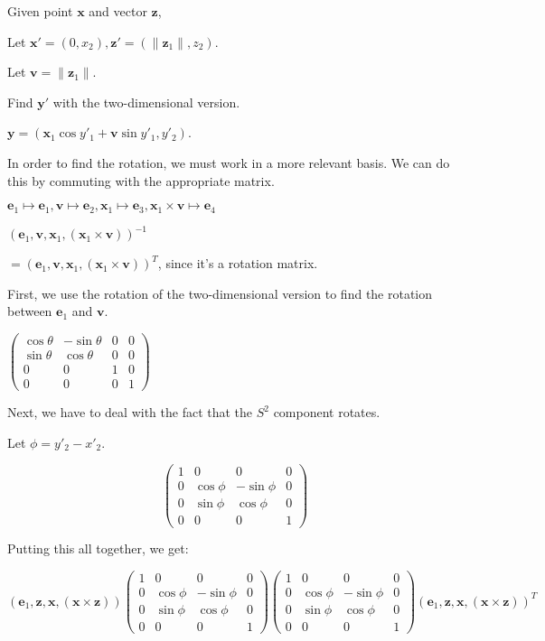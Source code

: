 \bigskip

Given point $\textbf{x}$ and vector $\textbf{z}$,

Let $\textbf{x}' = (0,x_2), \textbf{z}' = (\|\textbf{z}_1\|,z_2)$.

Let $\textbf{v} = \|\textbf{z}_1\|$.

Find $\textbf{y}'$ with the two-dimensional version.

$\textbf{y} = (\textbf{x}_1\cos y'_1+\textbf{v}\sin y'_1, y'_2)$.

In order to find the rotation, we must work in a more relevant basis. We can do this by commuting with the appropriate matrix.

$\textbf{e}_1 \mapsto \textbf{e}_1, \textbf{v} \mapsto \textbf{e}_2, \textbf{x}_1 \mapsto \textbf{e}_3, \textbf{x}_1 \times \textbf{v} \mapsto \textbf{e}_4$

$(\textbf{e}_1, \textbf{v},\textbf{x}_1,(\textbf{x}_1 \times \textbf{v}))^{-1}$

$= (\textbf{e}_1, \textbf{v},\textbf{x}_1,(\textbf{x}_1 \times \textbf{v}))^T$, since it's a rotation matrix.

First, we use the rotation of the two-dimensional version to find the rotation between $\textbf{e}_1$ and $\textbf{v}$.


$\left(\begin{array}{cccc} \cos\theta & -\sin\theta & 0 & 0 \\ \sin\theta & \cos\theta & 0 & 0 \\ 0 & 0 & 1 & 0 \\ 0 & 0 & 0 & 1 \end{array} \right)$

Next, we have to deal with the fact that the $S^2$ component rotates.

Let $\phi = y'_2-x'_2$.

$$\left(\begin{array}{cccc} 1 & 0 & 0 & 0 \\ 0 & \cos\phi & -\sin\phi & 0 \\ 0 & \sin\phi & \cos\phi & 0 \\ 0 & 0 & 0 & 1 \end{array} \right)$$

Putting this all together, we get:

$$(\textbf{e}_1,\textbf{z},\textbf{x},(\textbf{x} \times \textbf{z}))
\left(\begin{array}{cccc} 1 & 0 & 0 & 0 \\ 0 & \cos\phi & -\sin\phi & 0 \\ 0 & \sin\phi & \cos\phi & 0 \\ 0 & 0 & 0 & 1 \end{array} \right)
\left(\begin{array}{cccc} 1 & 0 & 0 & 0 \\ 0 & \cos\phi & -\sin\phi & 0 \\ 0 & \sin\phi & \cos\phi & 0 \\ 0 & 0 & 0 & 1 \end{array} \right)
(\textbf{e}_1,\textbf{z},\textbf{x},(\textbf{x} \times \textbf{z}))^T$$

